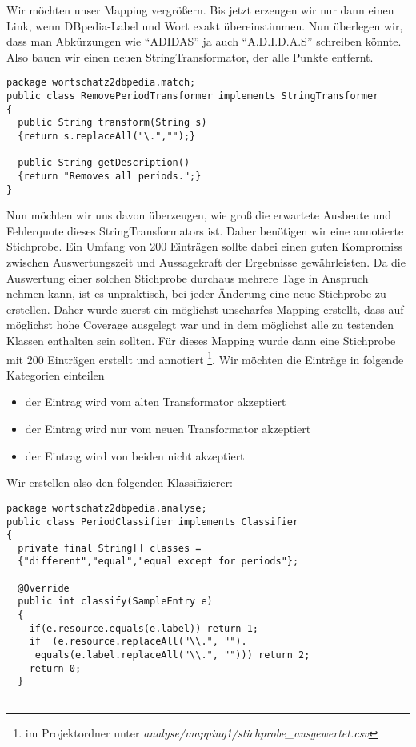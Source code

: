 \begin{bsp}
Wir möchten unser Mapping vergrößern.
Bis jetzt erzeugen wir nur dann einen Link, wenn DBpedia-Label und Wort exakt übereinstimmen.
Nun überlegen wir, dass man Abkürzungen wie "`ADIDAS"' ja auch "`A.D.I.D.A.S"' schreiben könnte. Also bauen wir einen neuen StringTransformator, der alle Punkte entfernt.
\begin{lstlisting}
package wortschatz2dbpedia.match;
public class RemovePeriodTransformer implements StringTransformer
{
  public String transform(String s)
  {return s.replaceAll("\.","");}
  
  public String getDescription()
  {return "Removes all periods.";}
} 
\end{lstlisting}
Nun möchten wir uns davon überzeugen, wie groß die erwartete Ausbeute und Fehlerquote dieses StringTransformators ist.
Daher benötigen wir eine annotierte Stichprobe. Ein Umfang von 200 Einträgen sollte dabei einen guten Kompromiss zwischen Auswertungszeit und Aussagekraft der Ergebnisse gewährleisten\footnotemark.
Da die Auswertung einer solchen Stichprobe durchaus mehrere Tage in Anspruch nehmen kann, ist es unpraktisch, bei jeder Änderung eine neue Stichprobe zu erstellen.
Daher wurde zuerst ein möglichst unscharfes Mapping erstellt, dass auf möglichst hohe Coverage ausgelegt war und in dem möglichst alle zu testenden Klassen enthalten sein sollten.
Für dieses Mapping wurde dann eine Stichprobe mit 200 Einträgen erstellt und annotiert \footnote{im Projektordner unter \emph{analyse/mapping1/stichprobe\_ausgewertet.csv}}.
Wir möchten die Einträge in folgende Kategorien einteilen
\begin{itemize}
\item der Eintrag wird vom alten Transformator akzeptiert
\item der Eintrag wird nur vom neuen Transformator akzeptiert
\item der Eintrag wird von beiden nicht akzeptiert
\end{itemize}
Wir erstellen also den folgenden Klassifizierer:
\begin{lstlisting}
package wortschatz2dbpedia.analyse;
public class PeriodClassifier implements Classifier
{
  private final String[] classes =
  {"different","equal","equal except for periods"}; 	
  
  @Override
  public int classify(SampleEntry e)
  {
    if(e.resource.equals(e.label)) return 1;
    if  (e.resource.replaceAll("\\.", "").
     equals(e.label.replaceAll("\\.", ""))) return 2;
    return 0;
  }


\end{lstlisting}
\end{bsp}
